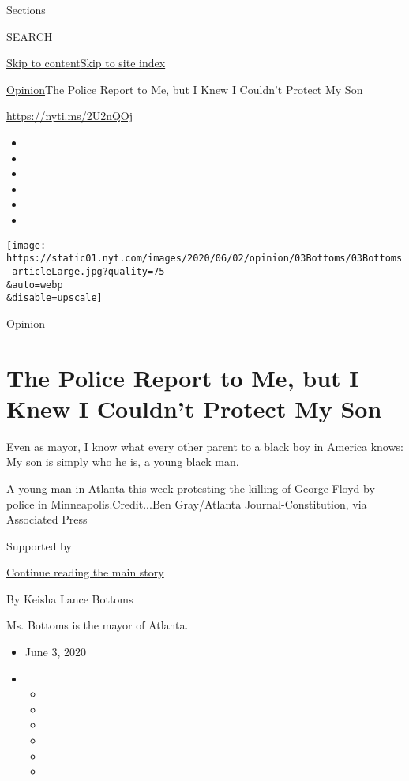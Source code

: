 Sections

SEARCH

\protect\hyperlink{site-content}{Skip to
content}\protect\hyperlink{site-index}{Skip to site index}

\href{/section/opinion}{Opinion}\textbar{}The Police Report to Me, but I
Knew I Couldn't Protect My Son

\url{https://nyti.ms/2U2nQOj}

\begin{itemize}
\item
\item
\item
\item
\item
\item
\end{itemize}

\texttt{[image: https://static01.nyt.com/images/2020/06/02/opinion/03Bottoms/03Bottoms-articleLarge.jpg?quality=75\\\&auto=webp\\\&disable=upscale]}

\href{/section/opinion}{Opinion}

\hypertarget{the-police-report-to-me-but-i-knew-i-couldnt-protect-my-son}{%
\section{The Police Report to Me, but I Knew I Couldn't Protect My
Son}\label{the-police-report-to-me-but-i-knew-i-couldnt-protect-my-son}}

Even as mayor, I know what every other parent to a black boy in America
knows: My son is simply who he is, a young black man.

A young man in Atlanta this week protesting the killing of George Floyd
by police in Minneapolis.Credit...Ben Gray/Atlanta Journal-Constitution,
via Associated Press

Supported by

\protect\hyperlink{after-sponsor}{Continue reading the main story}

By Keisha Lance Bottoms

Ms. Bottoms is the mayor of Atlanta.

\begin{itemize}
\item
  June 3, 2020
\item
  \begin{itemize}
  \item
  \item
  \item
  \item
  \item
  \item
  \end{itemize}
\end{itemize}

